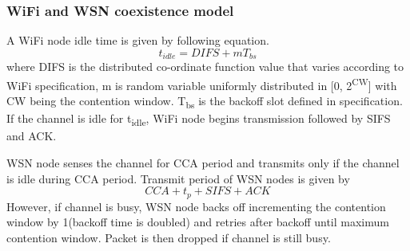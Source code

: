 \documentclass[a4paper]{article}
\begin{document}
\subsubsection{{WiFi} and {WSN} coexistence model}
A {WiFi} node idle time is given by following equation.
\begin{equation}
					t_{idle} = DIFS + mT_{bs}
\end{equation}
where DIFS is the distributed co-ordinate function value that varies according to {WiFi} specification, m is random variable uniformly distributed in [0, 2\textsuperscript{CW}] with {CW} being the contention window. T\textsubscript{bs} is the backoff slot defined in specification.
If the channel is idle for t\textsubscript{idle}, {WiFi} node begins transmission followed by {SIFS} and {ACK}.

{WSN} node senses the channel for CCA period and transmits only if the channel is idle during CCA period. 
Transmit period of {WSN} nodes is given by
\begin{equation}
					{CCA} + t_p + SIFS + ACK
\end{equation}
However, if channel is busy, {WSN} node backs off incrementing the contention window by 1(backoff time is doubled) and retries after backoff until maximum contention window. Packet is then dropped if channel is still busy.
\end{document}
